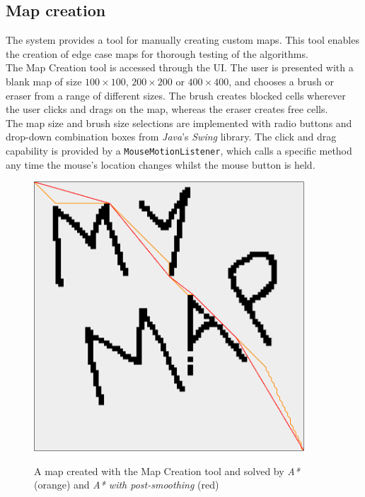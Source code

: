 \documentclass[12pt,notitlepage]{report}
\begin{document}
\subsection{Map creation}

The system provides a tool for manually creating custom maps. This tool enables the creation of edge case maps for thorough testing of the algorithms.\\

\noindent
The Map Creation tool is accessed through the UI. The user is presented with a blank map of size $100 \times 100$, $200 \times 200$ or $400 \times 400$, and chooses a brush or eraser from a range of different sizes. The brush creates blocked cells wherever the user clicks and drags on the map, whereas the eraser creates free cells.\\

\noindent
The map size and brush size selections are implemented with radio buttons and drop-down combination boxes from {\em Java}'s {\em Swing} library. The click and drag capability is provided by a {\tt MouseMotionListener}, which calls a specific method any time the mouse's location changes whilst the mouse button is held.

\begin{figure}
\centering
  {\includegraphics[width=0.9\textwidth]{creationmode.png}}
  \caption[A map created with the Map Creation tool]{A map created with the Map Creation tool and solved by {\em A*} (orange) and {\em A* with post-smoothing} (red)} 
\end{figure}
\end{document}

